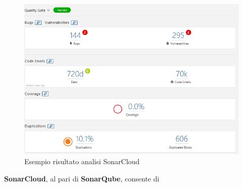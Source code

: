 \begin{figure}[htbp]
	\centering
	\includegraphics[scale=0.5, trim = 0cm 0cm 0cm 0cm, clip=true]{figSonarCloud/analisi.PNG}
	\caption{Esempio risultato analisi SonarCloud}
	\label{fig:analisi}
\end{figure}

\textbf{SonarCloud}, al pari di \textbf{SonarQube}, consente di 